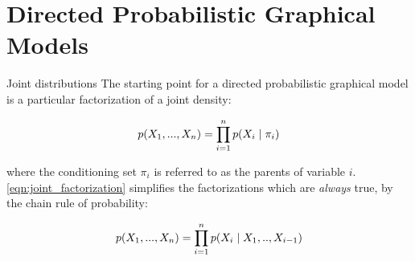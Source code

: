 \documentclass[10pt]{beamer}
\newcommand{\x}{X}
\begin{document}
\section{Directed Probabilistic  Graphical Models }
\begin{frame}{Joint distributions}
The starting point for a directed probabilistic graphical model is a particular factorization of a joint density:

\begin{equation}
\label{eqn:joint_factorization}
 p(\x_1, ..., \x_n) = \ds\prod_{i=1}^n p(\x_i \cond \pi_i ) 
\end{equation}

where the conditioning set $\pi_i$ is referred to as the \alert{parents} of  variable $i$. \\

\eqref{eqn:joint_factorization} simplifies the factorizations which are \textit{always} true, by the chain rule of probability:

\[ p(\x_1, ..., \x_n) = \ds\prod_{i=1}^n p(\x_i \cond \x_1, .., \x_{i-1} ) \]



\end{frame}

\end{document}
